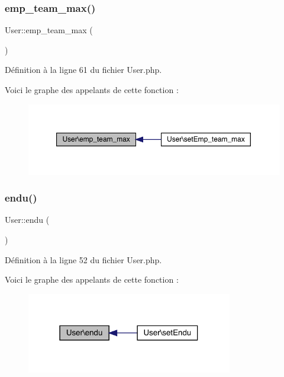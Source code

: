 \subsubsection{\texorpdfstring{emp\+\_\+team\+\_\+max()}{emp\_team\_max()}}
{\footnotesize\ttfamily User\+::emp\+\_\+team\+\_\+max (\begin{DoxyParamCaption}{ }\end{DoxyParamCaption})}



Définition à la ligne 61 du fichier User.\+php.

Voici le graphe des appelants de cette fonction \+:\nopagebreak
\begin{figure}[H]
\begin{center}
\leavevmode
\includegraphics[width=350pt]{class_user_aa4d14a670efb836bee049266a044d818_icgraph}
\end{center}
\end{figure}
\mbox{\label{class_user_aa7ae3e562d611c4cf112a618db183660}} 
\subsubsection{\texorpdfstring{endu()}{endu()}}
{\footnotesize\ttfamily User\+::endu (\begin{DoxyParamCaption}{ }\end{DoxyParamCaption})}



Définition à la ligne 52 du fichier User.\+php.

Voici le graphe des appelants de cette fonction \+:\nopagebreak
\begin{figure}[H]
\begin{center}
\leavevmode
\includegraphics[width=255pt]{class_user_aa7ae3e562d611c4cf112a618db183660_icgraph}
\end{center}
\end{figure}
\mbox{\label{class_user_a3c4f83665c4b093ac23cb1ef8c962b4e}} 

